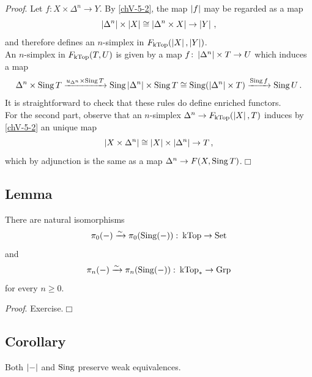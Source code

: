         \emph{Proof}. Let $f \colon X \times \Delta^n \to Y$. By \ref{chV-5-2}, the map $\left| f \right|$ may be regarded as a map
        \begin{equation*}
            \left| \Delta^n \right| \times \left| X \right| \cong \left| \Delta^n \times X \right| \to \left| Y \right| \,,
        \end{equation*}
        and therefore defines an $n$-simplex in $F_{\operatorname{kTop}}(\left| X \right|, \left| Y \right|)$.\\
        An $n$-simplex in $F_{\operatorname{kTop}}(T, U)$ is given by a map $f \colon \left| \Delta^n \right| \times T \to U$ which induces a map
        \begin{equation*}
            \Delta^n \times \operatorname{Sing} T \xrightarrow{u_{\Delta^n} \times \operatorname{Sing} T} \operatorname{Sing} \left| \Delta^n \right| \times \operatorname{Sing} T \cong \operatorname{Sing}(\left| \Delta^n \right| \times T) \xrightarrow{\operatorname{Sing} f} \operatorname{Sing} U \,.
        \end{equation*}
        It is straightforward to check that these rules do define enriched functors.\\
        For the second part, observe that an $n$-simplex $\Delta^n \to F_{\operatorname{kTop}}(\left| X \right|, T)$ induces by \ref{chV-5-2} an unique map
        \begin{equation*}
            \left| X \times \Delta^n \right| \cong \left| X \right| \times \left| \Delta^n \right| \to T \,,
        \end{equation*}
        which by adjunction is the same as a map $\Delta^n \to F(X, \operatorname{Sing} T)$.\hfill$\Box$

    \subsection{Lemma}\label{chV-5-4}
        There are natural isomorphisms
        \begin{equation*}
            \pi_0(-) \xrightarrow{\sim} \pi_0(\operatorname{Sing}(-)) \,\colon \operatorname{kTop} \to \operatorname{Set} 
        \end{equation*}
        and
        \begin{equation*}
            \pi_n(-) \xrightarrow{\sim} \pi_n(\operatorname{Sing}(-)) \,\colon \operatorname{kTop}_{*} \to \operatorname{Grp} 
        \end{equation*}
        for every $n \geq 0$.
        \smallskip

        \emph{Proof}. Exercise.\hfill$\Box$

    \subsection{Corollary}\label{chV-5-5}
        Both $\left| - \right|$ and $\operatorname{Sing}$ preserve weak equivalences.
        \smallskip

